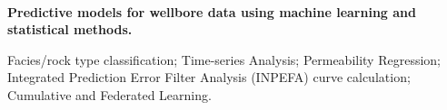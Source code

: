 \\
\vspace{-.2em}
\begin{xitemize}
    \item \textbf{Predictive models for wellbore data using machine learning and statistical methods.}
    \begin{zitemize}
        \item Facies/rock type classification; Time-series Analysis; Permeability Regression; Integrated Prediction Error Filter Analysis (INPEFA) curve calculation; Cumulative and Federated Learning.
    \end{zitemize}
\end{xitemize}